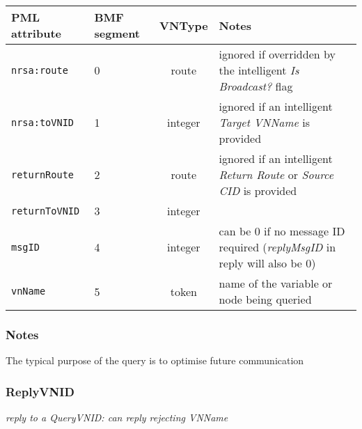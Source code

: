 \documentclass[pdftex,a4paper]{article}
\newcommand{\XMLfont}[1]{{\tt \small #1}}
\begin{document}
\begin{table}[!h]
  \begin{center}
    \label{tab:QueryVNID}
    \begin{tabular}{|l|p{13mm}|c|p{60mm}|}
      \hline

      \textbf{PML attribute} & \textbf{BMF segment} & \textbf{VNType}
      & \textbf{Notes} \\\hline

      \XMLfont{nrsa:route} & 0 & route & ignored if overridden by the
      intelligent {\em Is Broadcast?} flag \\\hline

      \XMLfont{nrsa:toVNID} & 1 & integer & ignored if an intelligent {\em
      Target VNName} is provided \\\hline

      \XMLfont{returnRoute} & 2 & route & ignored if an
      intelligent {\em Return Route} or {\em Source CID} is provided
      \\\hline

      \XMLfont{returnToVNID} & 3 & integer & \\\hline

      \XMLfont{msgID} & 4 & integer & can be 0 if no message ID
      required ({\em replyMsgID} in reply will also be 0) \\\hline

      \XMLfont{vnName} & 5 & token & name of the variable or node
      being queried \\\hline

    \end{tabular}
  \end{center}
\end{table}

\subsubsection*{Notes}

The typical purpose of the query is to optimise future communication

\subsubsection{ReplyVNID}

{\em reply to a QueryVNID: can reply rejecting VNName}
\end{document}
